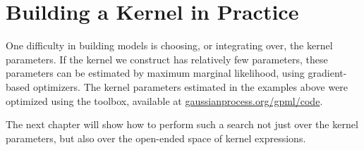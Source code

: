 \fi





\section{Building a Kernel in Practice}


One difficulty in building \gp{} models is choosing, or integrating over, the kernel parameters.
If the kernel we construct has relatively few parameters, these parameters can be estimated by maximum marginal likelihood, using gradient-based optimizers.
The kernel parameters estimated in the examples above were optimized using the \GPML{} toolbox, available at \url{gaussianprocess.org/gpml/code}.

The next chapter will show how to perform such a search not just over the kernel parameters, but also over the open-ended space of kernel expressions.

